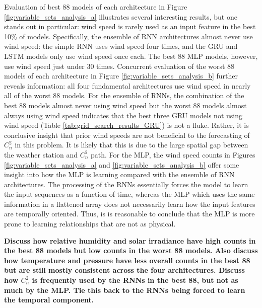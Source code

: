 Evaluation of best 88 models of each architecture in Figure \ref{fig:variable_sets_analysis_a} illustrates several interesting results, but one stands out in particular: wind speed is rarely used as an input feature in the best 10\% of models. Specifically, the ensemble of RNN architectures almost never use wind speed: the simple RNN uses wind speed four times, and the GRU and LSTM models only use wind speed once each. The best 88 MLP models, however, use wind speed just under 30 times. Concurrent evaluation of the worst 88 models of each architecture in Figure \ref{fig:variable_sets_analysis_b} further reveals information: all four fundamental architectures use wind speed in nearly all of the worst 88 models. For the ensemble of RNNs, the combination of the best 88 models almost never using wind speed but the worst 88 models almost always using wind speed indicates that the best three GRU models not using wind speed (Table \ref{tab:grid_search_results_GRU}) is not a fluke. Rather, it is conclusive insight that prior wind speeds are not beneficial to the forecasting of $C_{n}^{2}$ in this problem. It is likely that this is due to the large spatial gap between the weather station and $C_{n}^{2}$ path. For the MLP, the wind speed counts in Figures \ref{fig:variable_sets_analysis_a} and \ref{fig:variable_sets_analysis_b} offer some insight into how the MLP is learning compared with the ensemble of RNN architectures. The processing of the RNNs essentially forces the model to learn the input sequences as a function of time, whereas the MLP which uses the same information in a flattened array does not necessarily learn how the input features are temporally oriented. Thus, is is reasonable to conclude that the MLP is more prone to learning relationships that are not as physical. 

\textbf{Discuss how relative humidity and solar irradiance have high counts in the best 88 models but low counts in the worst 88 models. Also discuss how temperature and pressure have less overall counts in the best 88 but are still mostly consistent across the four architectures. Discuss how $C_{n}^{2}$ is frequently used by the RNNs in the best 88, but not as much by the MLP. Tie this back to the RNNs being forced to learn the temporal component.}